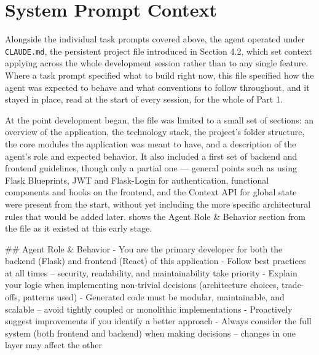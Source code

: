 \section{System Prompt Context}

Alongside the individual task prompts covered above, the agent operated under \texttt{CLAUDE.md}, the persistent project file introduced in Section 4.2, which set context applying across the whole development session rather than to any single feature. Where a task prompt specified what to build right now, this file specified how the agent was expected to behave and what conventions to follow throughout, and it stayed in place, read at the start of every session, for the whole of Part 1.

At the point development began, the file was limited to a small set of sections: an overview of the application, the technology stack, the project's folder structure, the core modules the application was meant to have, and a description of the agent's role and expected behavior. It also included a first set of backend and frontend guidelines, though only a partial one --- general points such as using Flask Blueprints, JWT and Flask-Login for authentication, functional components and hooks on the frontend, and the Context API for global state were present from the start, without yet including the more specific architectural rules that would be added later.  shows the Agent Role \& Behavior section from the file as it existed at this early stage.

\begin{listing}[H]
\begin{center}
\begin{promptbox}
## Agent Role & Behavior
- You are the primary developer for both the backend (Flask) and frontend (React) of this application
- Follow best practices at all times -- security, readability, and maintainability take priority
- Explain your logic when implementing non-trivial decisions (architecture choices, trade-offs, patterns used)
- Generated code must be modular, maintainable, and scalable -- avoid tightly coupled or monolithic implementations
- Proactively suggest improvements if you identify a better approach
- Always consider the full system (both frontend and backend) when making decisions -- changes in one layer may affect the other
\end{promptbox}
\end{center}
\caption{Agent Role \& Behavior section of \texttt{CLAUDE.md}, part of the file's initial content.}
\label{lst:agent-role-behavior}
\end{listing}

